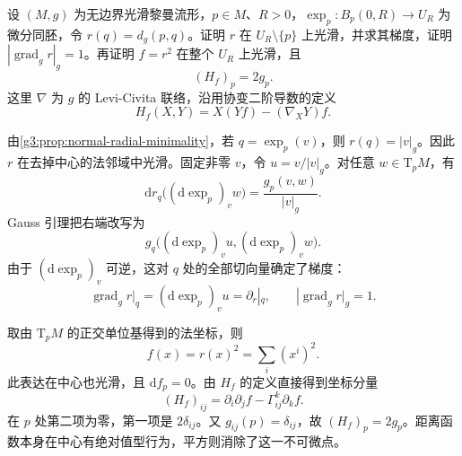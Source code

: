 \begin{exercise}\label{g3:ex:squared-distance-at-center}
	设 \((M,g)\) 为无边界光滑黎曼流形，\(p\in M\)、\(R>0\)，\(\exp_p:B_p(0,R)\to U_R\) 为微分同胚，令 \(r(q)=d_g(p,q)\)。证明 \(r\) 在 \(U_R\setminus\{p\}\) 上光滑，并求其梯度，证明 \(|\operatorname{grad}_g r|_g=1\)。再证明 \(f=r^2\) 在整个 \(U_R\) 上光滑，且
	\[
		(H_f)_p=2g_p.
	\]
	这里 \(\nabla\) 为 \(g\) 的 Levi-Civita 联络，沿用协变二阶导数的定义
	\[
		H_f(X,Y)=X(Yf)-(\nabla_XY)f.
	\]
\end{exercise}
\begin{solution}
	由\cref{g3:prop:normal-radial-minimality}，若 \(q=\exp_p(v)\)，则 \(r(q)=|v|_g\)。因此 \(r\) 在去掉中心的法邻域中光滑。固定非零 \(v\)，令 \(u=v/|v|_g\)。对任意 \(w\in\mathrm{T}_pM\)，有
	\[
		\mathrm{d}r_q\bigl((\mathrm{d}\exp_p)_vw\bigr)
		=\frac{g_p(v,w)}{|v|_g}.
	\]
	Gauss 引理把右端改写为
	\[
		g_q\bigl((\mathrm{d}\exp_p)_vu,(\mathrm{d}\exp_p)_vw\bigr).
	\]
	由于 \((\mathrm{d}\exp_p)_v\) 可逆，这对 \(q\) 处的全部切向量确定了梯度：
	\[
		\operatorname{grad}_g r\big|_q=(\mathrm{d}\exp_p)_vu=\partial_r|_q,
		\qquad |\operatorname{grad}_g r|_g=1.
	\]

	取由 \(\mathrm{T}_pM\) 的正交单位基得到的法坐标，则
	\[
		f(x)=r(x)^2=\sum_i(x^i)^2.
	\]
	此表达在中心也光滑，且 \(\mathrm{d}f_p=0\)。由 \(H_f\) 的定义直接得到坐标分量
	\[
		(H_f)_{ij}=\partial_i\partial_jf-\Gamma^k_{ij}\partial_kf.
	\]
	在 \(p\) 处第二项为零，第一项是 \(2\delta_{ij}\)。又 \(g_{ij}(p)=\delta_{ij}\)，故 \((H_f)_p=2g_p\)。距离函数本身在中心有绝对值型行为，平方则消除了这一不可微点。
\end{solution}


